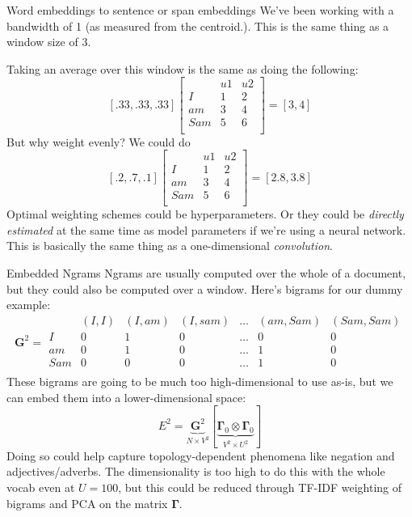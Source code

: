 \documentclass[10pt]{beamer}
\begin{document}
\begin{frame}{Word embeddings to sentence or span embeddings}
We've been working with a bandwidth of 1 (as measured from the centroid.). This is the same thing as a window size of 3.

Taking an average over this window is the same as doing the following:
\[[.33, .33,  .33]\left[\begin{array}{c|cc}
     & u1 & u2\\
     \hline
I    & 1 & 2\\
am   & 3 & 4\\
Sam  & 5 & 6\\
\end{array}\right]
= [3, 4]
\] 
But why weight evenly?  We could do
\[[.2, .7,  .1]\left[\begin{array}{c|cc}
     & u1 & u2\\
     \hline
I    & 1 & 2\\
am   & 3 & 4\\
Sam  & 5 & 6\\
\end{array}\right]
= [2.8, 3.8]
\] 
Optimal weighting schemes could be hyperparameters.  Or they could be \textit{directly estimated} at the same time as model parameters if we're using a neural network.  This is basically the same thing as a one-dimensional \textit{convolution}.
\end{frame}

\begin{frame}{Embedded Ngrams}
Ngrams are usually computed over the whole of a document, but they could also be computed over a window.  Here's bigrams for our dummy example:
\[\bm{G}^2 = {\displaystyle
\begin{array}{c|cccccc}
     & (I,I) & (I, am) & (I, sam) & \hdots & (am, Sam) & (Sam, Sam)\\
     \hline
I    & 0 & 1 & 0 & \hdots & 0 & 0\\
am   & 0 & 1 & 0 & \hdots & 1 & 0\\
Sam  & 0 & 0 & 0 & \hdots & 1 & 0\\
\end{array}}
\]
These bigrams are going to be much too high-dimensional to use as-is, but we can embed them into a lower-dimensional space:
\[
E^2 = \underbrace{\bm{G}^2}_{N\times V^2}\left[\underbrace{\bm{\Gamma}_0\otimes \bm{\Gamma}_0}_{V^2 \times U^2}\right]
\]
Doing so could help capture topology-dependent phenomena like negation and adjectives/adverbs.  The dimensionality is too high to do this with the whole vocab even at $U = 100$, but this could be reduced through TF-IDF weighting of bigrams and PCA on the matrix $\bm\Gamma$.
\end{frame}
\end{document}
